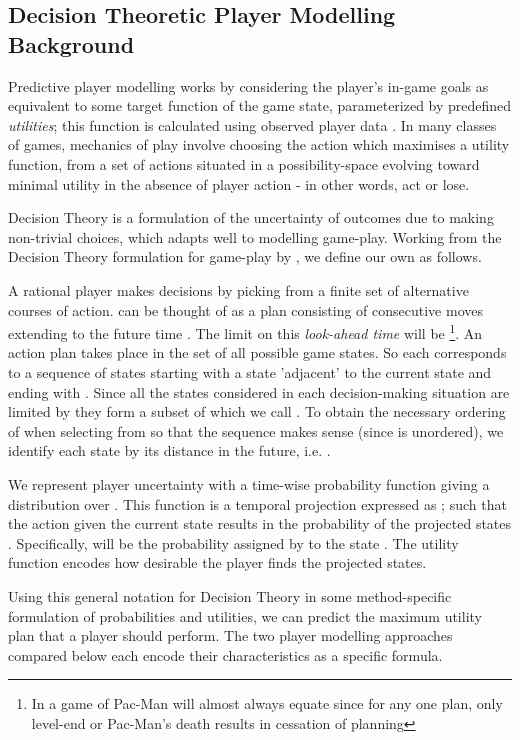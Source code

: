 \documentclass[conference]{IEEEtran}
\begin{document}
\subsection{Decision Theoretic Player Modelling Background}
\label{dtpm}
Predictive player modelling works by considering the player's in-game goals as equivalent to some target function of the game state, parameterized by predefined \textit{utilities}; this function is calculated using observed player data \cite{Thue2006}. In many classes of games, mechanics of play involve choosing the action which maximises a utility function, from a set of actions situated in a possibility-space evolving toward minimal utility in the absence of player action - in other words, act or lose.

Decision Theory \cite{Curley1989} is a formulation of the uncertainty of outcomes due to making non-trivial choices, which adapts well to modelling game-play. Working from the Decision Theory formulation for game-play by \cite{Gmytrasiewicz2000}, we define our own as follows.

A rational player makes decisions by picking from a finite set  of alternative courses of action.  can be thought of as a plan consisting of consecutive moves extending to the future time . The limit on this \textit{look-ahead time} will be \footnote{In a game of Pac-Man  will almost always equate  since for any one plan, only level-end or Pac-Man's death results in cessation of planning}. An action plan takes place in the set  of all possible game states. So each  corresponds to a sequence of states  starting with a state 'adjacent' to the current state and ending with . Since all the states considered in each decision-making situation are limited by  they form a subset of  which we call . To obtain the necessary ordering of  when selecting from  so that the sequence  makes sense (since  is unordered), we identify each state by its distance in the future, i.e. .

We represent player uncertainty with a time-wise probability function giving a distribution  over . This function is a temporal projection expressed as ; such that the action  given the current state  results in the probability of the projected states . Specifically,  will be the probability assigned by  to the state . The utility function  encodes how desirable the player finds the projected states.

Using this general notation for Decision Theory in some method-specific formulation of probabilities and utilities, we can predict the maximum utility plan  that a player should perform. The two player modelling approaches compared below each encode their characteristics as a specific formula.
\end{document}
